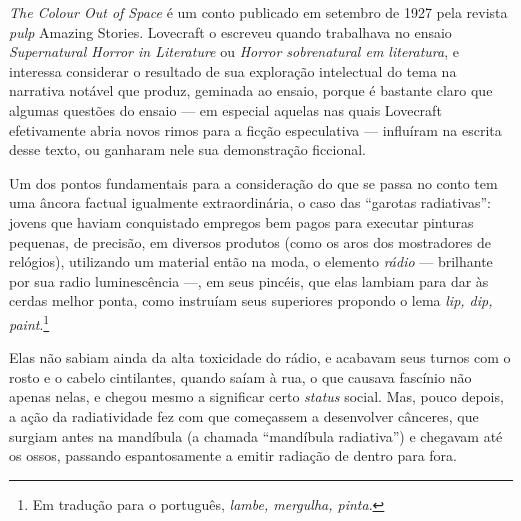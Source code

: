 \textit{The Colour Out of Space} é um conto publicado em setembro de 1927
pela revista \textit{pulp} Amazing Stories. Lovecraft o escreveu quando
trabalhava no ensaio \textit{Supernatural Horror in Literature} ou \textit{Horror
sobrenatural em literatura}, e interessa considerar o resultado de sua
exploração intelectual do tema na narrativa notável que produz, geminada
ao ensaio, porque é bastante claro que algumas questões do ensaio --- em
especial aquelas nas quais Lovecraft efetivamente abria novos rimos para %
a ficção especulativa --- influíram na escrita desse texto, ou ganharam
nele sua demonstração ficcional.


Um dos pontos fundamentais para a consideração do que se passa no conto
tem uma âncora factual igualmente extraordinária, o caso das ``garotas
radiativas'': jovens que haviam conquistado empregos bem pagos para
executar pinturas pequenas, de precisão, em diversos produtos (como os
aros dos mostradores de relógios), utilizando um material então na moda,
o elemento \textit{rádio} --- brilhante por sua radio luminescência ---, em
seus pincéis, que elas lambiam para dar às cerdas melhor ponta, como
instruíam seus superiores propondo o lema \textit{lip, dip, paint}.\footnote{Em tradução para o português, \textit{lambe, mergulha, pinta}.}

Elas não sabiam ainda da alta toxicidade do rádio, e acabavam seus
turnos com o rosto e o cabelo cintilantes, quando saíam à rua, o que
causava fascínio não apenas nelas, e chegou mesmo a significar certo
\textit{status} social. Mas, pouco depois, a ação da radiatividade fez com
que começassem a desenvolver cânceres, que surgiam antes na mandíbula (a
chamada ``mandíbula radiativa'') e chegavam até os ossos, passando
espantosamente a emitir radiação de dentro para fora.

